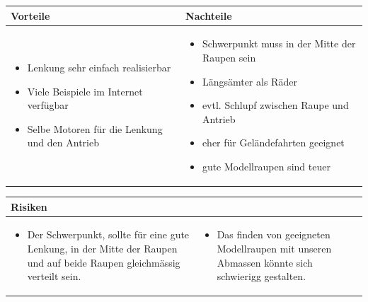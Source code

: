 \begin{table}[h]
\begin{tabular}{p{} | p{}}


 \textbf{Vorteile} & \textbf{Nachteile} \\ \hline
	 
\begin{itemize}
\item Lenkung sehr einfach realisierbar
\item Viele Beispiele im Internet verfügbar
\item Selbe Motoren für die Lenkung und den Antrieb
\end{itemize}

 
 &
 
\begin{itemize}
\item Schwerpunkt muss in der Mitte der Raupen sein
\item Längsämter als Räder
\item evtl. Schlupf zwischen Raupe und Antrieb
\item eher für Geländefahrten geeignet
\item gute Modellraupen sind teuer
\end{itemize}

\end{tabular}
\end{table}

\begin{table}[h]
\begin{tabular}{p{}p{}}


 \textbf{Risiken} & \\ \hline
	 
\begin{itemize}
\item Der Schwerpunkt, sollte für eine gute Lenkung, in der Mitte der Raupen und auf beide Raupen gleichmässig verteilt sein.
\end{itemize}
&
\begin{itemize}
\item Das finden von geeigneten Modellraupen mit unseren Abmassen könnte sich schwierigg gestalten.
\end{itemize}


 
\end{tabular}
\end{table}

\pagebreak


